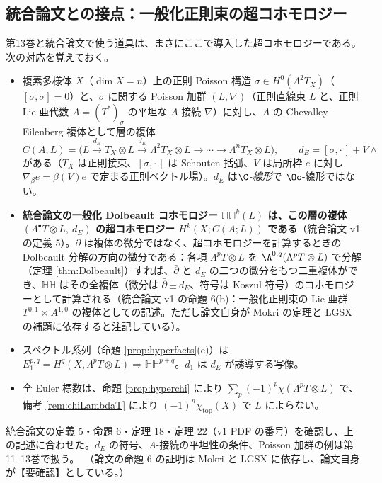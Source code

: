 \subsection{統合論文との接点：一般化正則束の超コホモロジー}
第13巻と統合論文で使う道具は、まさにここで導入した超コホモロジーである。次の対応を覚えておく。
\begin{itemize}
\item 複素多様体 $X$（$\dim X=n$）上の正則 Poisson 構造 $\sigma\in H^0(\Lambda^2T_X)$（$[\sigma,\sigma]=0$）と、$\sigma$ に関する Poisson 加群 $(L,\nabla)$（正則直線束 $L$ と、正則 Lie 亜代数 $A=(T^*)_\sigma$ の平坦な $A$-接続 $\nabla$）に対し、$A$ の Chevalley--Eilenberg 複体として層の複体
\[
C(A;L)=\big(L\xrightarrow{d_E}T_X\otimes L\xrightarrow{d_E}\Lambda^2T_X\otimes L\to\cdots\to\Lambda^nT_X\otimes L\big),\qquad d_E=[\sigma,\cdot\,]+V\wedge
\]
がある（$T_X$ は正則接束、$[\sigma,\cdot\,]$ は Schouten 括弧、$V$ は局所枠 $e$ に対し $\nabla_\beta e=\beta(V)e$ で定まる正則ベクトル場）。$d_E$ は\emph{$\C$-線形}で $\Oc$-線形ではない。
\item \textbf{統合論文の一般化 Dolbeault コホモロジー $\mathbb{HH}^k(L)$ は、この層の複体 $(\Lambda^\bullet T\otimes L,\ d_E)$ の超コホモロジー $H^k(X;C(A;L))$ である}（統合論文 v1 の定義 5）。$\bar\partial$ は複体の微分ではなく、超コホモロジーを計算するときの Dolbeault 分解の方向の微分である：各項 $\Lambda^pT\otimes L$ を $\A^{0,q}(\Lambda^pT\otimes L)$ で分解（定理 \ref{thm:Dolbeault}）すれば、$\bar\partial$ と $d_E$ の二つの微分をもつ二重複体ができ、$\mathbb{HH}$ はその全複体（微分は $\bar\partial\pm d_E$、符号は Koszul 符号）のコホモロジーとして計算される（統合論文 v1 の命題 6(b)：一般化正則束の Lie 亜群 $T^{0,1}\bowtie A^{1,0}$ の複体としての記述。ただし論文自身が Mokri の定理と LGSX の補題に依存すると注記している）。
\item スペクトル系列（命題 \ref{prop:hyperfacts}(e)）は $E_1^{p,q}=H^q(X,\Lambda^pT\otimes L)\Rightarrow\mathbb{HH}^{p+q}$。$d_1$ は $d_E$ が誘導する写像。
\item 全 Euler 標数は、命題 \ref{prop:hyperchi} により $\sum_p(-1)^p\chi(\Lambda^pT\otimes L)$ で、備考 \ref{rem:chiLambdaT} により $(-1)^n\chi_{\mathrm{top}}(X)$ で $L$ によらない。
\end{itemize}
統合論文の定義 5・命題 6・定理 18・定理 22（v1 PDF の番号）を確認し、上の記述に合わせた。$d_E$ の符号、$A$-接続の平坦性の条件、Poisson 加群の例は第11--13巻で扱う。\tQ\ （論文の命題 6 の証明は Mokri と LGSX に依存し、論文自身が【要確認】としている。）
